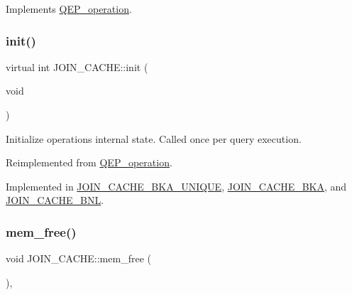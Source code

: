 Implements \mbox{\hyperlink{classQEP__operation_a4faf706cddaf3ae613fe92434776df5e}{Q\+E\+P\+\_\+operation}}.

\mbox{\label{classJOIN__CACHE_a1dcdce348bba725c675b327eb90aa924}} 
\subsubsection{\texorpdfstring{init()}{init()}}
{\footnotesize\ttfamily virtual int J\+O\+I\+N\+\_\+\+C\+A\+C\+H\+E\+::init (\begin{DoxyParamCaption}\item[{void}]{ }\end{DoxyParamCaption})\hspace{0.3cm}{\ttfamily [pure virtual]}}

Initialize operation\textquotesingle{}s internal state. Called once per query execution. 

Reimplemented from \mbox{\hyperlink{classQEP__operation_a27930ae9c3ab63a046135704707190fa}{Q\+E\+P\+\_\+operation}}.



Implemented in \mbox{\hyperlink{group__Query__Optimizer_gaa7ca6a85294c32bac8c69bea0c4e5fe1}{J\+O\+I\+N\+\_\+\+C\+A\+C\+H\+E\+\_\+\+B\+K\+A\+\_\+\+U\+N\+I\+Q\+UE}}, \mbox{\hyperlink{group__Query__Optimizer_ga327376f63198bf31a770fb89242d49aa}{J\+O\+I\+N\+\_\+\+C\+A\+C\+H\+E\+\_\+\+B\+KA}}, and \mbox{\hyperlink{group__Query__Optimizer_gab3dbb0f8b69dc30985e0d9a0ff94121f}{J\+O\+I\+N\+\_\+\+C\+A\+C\+H\+E\+\_\+\+B\+NL}}.

\mbox{\label{classJOIN__CACHE_a1607e84802fbf32ca66112ebdd0860b7}} 
\subsubsection{\texorpdfstring{mem\+\_\+free()}{mem\_free()}}
{\footnotesize\ttfamily void J\+O\+I\+N\+\_\+\+C\+A\+C\+H\+E\+::mem\+\_\+free (\begin{DoxyParamCaption}{ }\end{DoxyParamCaption})\hspace{0.3cm}{\ttfamily [inline]}, {\ttfamily [virtual]}}

